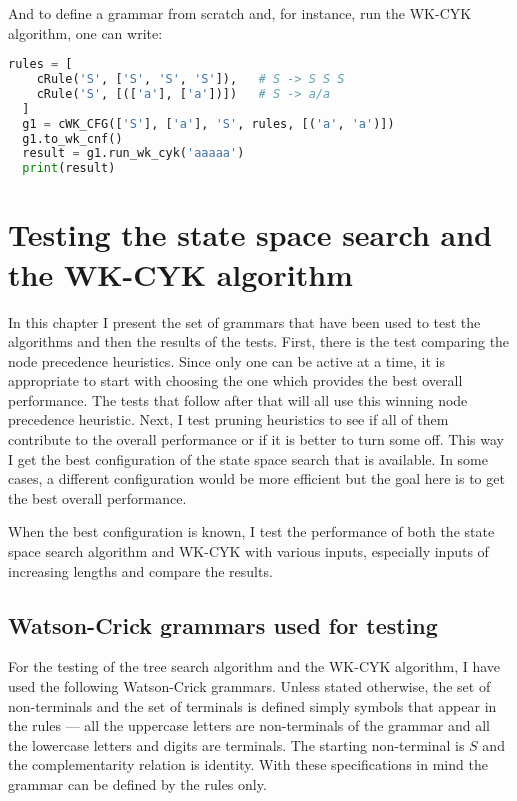 And to define a grammar from scratch and, for instance, run the WK-CYK algorithm, one can write:
\begin{lstlisting}[language=Python]
  rules = [
    cRule('S', ['S', 'S', 'S']),   # S -> S S S
    cRule('S', [(['a'], ['a'])])   # S -> a/a
  ]
  g1 = cWK_CFG(['S'], ['a'], 'S', rules, [('a', 'a')])
  g1.to_wk_cnf()
  result = g1.run_wk_cyk('aaaaa')
  print(result)
\end{lstlisting}


\chapter{Testing the state space search and the WK-CYK algorithm} \label{chapter:testing}

In this chapter I present the set of grammars that have been used to test the algorithms and then the results of the tests. First, there is the test comparing the node precedence heuristics. Since only one can be active at a time, it is appropriate to start with choosing the one which provides the best overall performance. The tests that follow after that will all use this winning node precedence heuristic. Next, I test pruning heuristics to see if all of them contribute to the overall performance or if it is better to turn some off. This way I get the best configuration of the state space search that is available. In some cases, a different configuration would be more efficient but the goal here is to get the best overall performance.

When the best configuration is known, I test the performance of both the state space search algorithm and WK-CYK with various inputs, especially inputs of increasing lengths and compare the results.

\section{Watson-Crick grammars used for testing}

For the testing of the tree search algorithm and the WK-CYK algorithm, I have used the following Watson-Crick grammars. Unless stated otherwise, the set of non-terminals and the set of terminals is defined simply symbols that appear in the rules --- all the uppercase letters are non-terminals of the grammar and all the lowercase letters and digits are terminals. The starting non-terminal is $S$ and the complementarity relation is identity. With these specifications in mind the grammar can be defined by the rules only.

